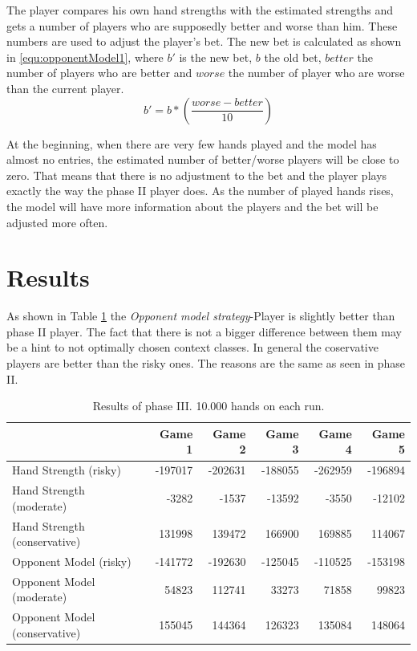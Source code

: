 The player compares his own hand strengths with the estimated strengths and gets a number of players who are supposedly better and worse than him. These numbers are used to adjust the player's bet. The new bet is calculated as shown in \ref{equ:opponentModel1}, where $b'$ is the new bet, $b$ the old bet, $better$ the number of players who are better and $worse$ the number of player who are worse than the current player.
\begin{equation}
	\label{equ:opponentModel1}
	b' = b * (\frac{worse - better}{10})
\end{equation}

At the beginning, when there are very few hands played and the model has almost no entries, the estimated number of better/worse players will be close to zero. That means that there is no adjustment to the bet and the player plays exactly the way the phase II player does. As the number of played hands rises, the model will have more information about the players and the bet will be adjusted more often.

\section{Results}
As shown in Table \ref{tbl:resultsPhase3a} the \emph{Opponent model strategy}-Player is slightly better than phase II player. The fact that there is not a bigger difference between them may be a hint to not optimally chosen context classes. In general the coservative players are better than the risky ones. The reasons are the same as seen in phase II.
\begin{table}[h]
	\centering
	\begin{tabular}[h]{l|r|r|r|r|r}
		& \textbf{Game 1} & \textbf{Game 2} & \textbf{Game 3} & \textbf{Game 4} & \textbf{Game 5}\\
		\hline
		Hand Strength (risky) & -197017 & -202631 & -188055 & -262959 & -196894\\
		Hand Strength (moderate) & -3282 & -1537 & -13592 & -3550 & -12102\\
		Hand Strength (conservative) & 131998 & 139472 & 166900 & 169885 & 114067\\
		Opponent Model (risky) & -141772 & -192630 & -125045 & -110525 & -153198\\
		Opponent Model (moderate) & 54823 & 112741 & 33273 & 71858 & 99823\\
		Opponent Model (conservative) & 155045 & 144364 & 126323 & 135084 & 148064\\
	\end{tabular}
	\label{tbl:resultsPhase3a}
	\caption{Results of phase III. 10.000 hands on each run.}
\end{table}


